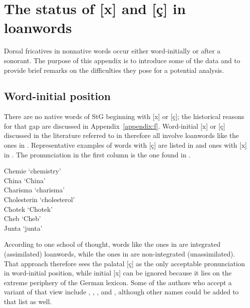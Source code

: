 \chapter{The status of [x] and [ç] in loanwords}\label{appendix:g}

Dorsal fricatives in nonnative words occur either word-initially or after a sonorant. The purpose of this appendix is to introduce some of the data and to provide brief remarks on the difficulties they pose for a potential analysis.

\section{Word-initial position}
There are no native words of StG beginning with [x] or [ç]; the historical reasons for that gap are discussed in Appendix~\ref{appendix:f}. Word-initial [x] or [ç] discussed in the literature referred to in  therefore all involve loanwords like the ones in . Representative examples of words with [ç] are listed in  and ones with [x] in . The pronunciation in the first column is the one found in \citet{Mangold2005}.

\ea \label{ex:appendix:g:1}
\ea  \label{ex:appendix:g:1a}
\relax  [çemiː]   \tab  Chemie   \tab  ‘chemistry’\\
    \relax  [çiːnɑ]   \tab  China    \tab ‘China’\\
    \relax  [çɑrɪsmɑ] \tab Charisma  \tab   ‘charisma’\\
    \relax  [çolɛsteriːn] \tab Cholesterin  \tab  ‘cholesterol’\\
\ex  \label{ex:appendix:g:1b}
\relax [xɔtɛk] \tab Chotek  \tab ‘Chotek’\\
    \relax [xɛp]   \tab Cheb    \tab ‘Cheb’  \\
    \relax [xʊntɑ] \tab Junta   \tab ‘junta’ \\
\z
\z

According to one school of thought, words like the ones in  are integrated (assimilated) loanwords, while the ones in  are non-integrated (unassimilated). That approach therefore sees the palatal [ç] as the only acceptable pronunciation in word-initial position, while initial [x] can be ignored because it lies on the extreme periphery of the German lexicon. Some of the authors who accept a variant of that view include \citet[956]{Wurzel1980}, \citet[3]{Hall1989}, \citet[210]{Wiese1996a}, and \citet[232, Footnote 3]{Noske1997}, although other names could be added to that list as well.

